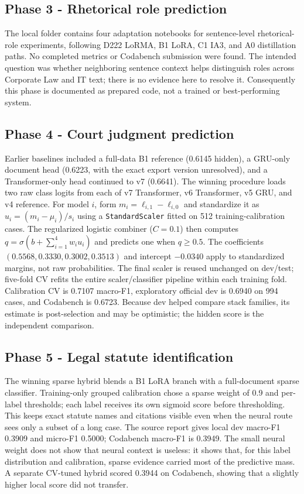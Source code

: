 \documentclass[11pt,oneside]{article}
\begin{document}
\subsection{Phase 3 - Rhetorical role prediction}
The local folder contains four adaptation notebooks for sentence-level rhetorical-role experiments, following D222 LoRMA, B1 LoRA, C1 IA3, and A0 distillation paths. No completed metrics or Codabench submission were found. The intended question was whether neighboring sentence context helps distinguish roles across Corporate Law and IT text; there is no evidence here to resolve it. Consequently this phase is documented as prepared code, not a trained or best-performing system.

\subsection{Phase 4 - Court judgment prediction}
Earlier baselines included a full-data B1 reference (0.6145 hidden), a GRU-only document head (0.6223, with the exact export version unresolved), and a Transformer-only head continued to v7 (0.6641). The winning procedure loads two raw class logits from each of v7 Transformer, v6 Transformer, v5 GRU, and v4 reference. For model $i$, form $m_i=\ell_{i,1}-\ell_{i,0}$ and standardize it as $u_i=(m_i-\mu_i)/s_i$ using a \texttt{StandardScaler} fitted on 512 training-calibration cases. The regularized logistic combiner ($C=0.1$) then computes $q=\sigma(b+\sum_{i=1}^{4}w_i u_i)$ and predicts one when $q\geq0.5$. The coefficients $(0.5568,0.3330,0.3002,0.3513)$ and intercept $-0.0340$ apply to standardized margins, not raw probabilities. The final scaler is reused unchanged on dev/test; five-fold CV refits the entire scaler/classifier pipeline within each training fold. Calibration CV is 0.7107 macro-F1, exploratory official dev is 0.6940 on 994 cases, and Codabench is 0.6723. Because dev helped compare stack families, its estimate is post-selection and may be optimistic; the hidden score is the independent comparison.

\subsection{Phase 5 - Legal statute identification}
The winning sparse hybrid blends a B1 LoRA branch with a full-document sparse classifier. Training-only grouped calibration chose a sparse weight of 0.9 and per-label thresholds; each label receives its own sigmoid score before thresholding. This keeps exact statute names and citations visible even when the neural route sees only a subset of a long case. The source report gives local dev macro-F1 0.3909 and micro-F1 0.5000; Codabench macro-F1 is 0.3949. The small neural weight does not show that neural context is useless: it shows that, for this label distribution and calibration, sparse evidence carried most of the predictive mass. A separate CV-tuned hybrid scored 0.3944 on Codabench, showing that a slightly higher local score did not transfer.
\end{document}
